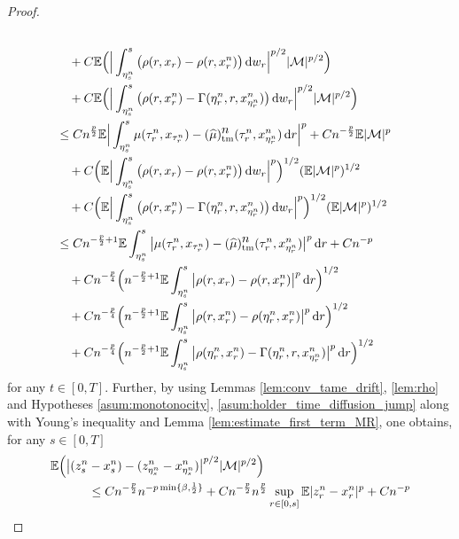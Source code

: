 \documentclass[reqno,  oneside, 12pt]{amsart}
\newcommand{\E}{\mathbb E}
\begin{document}
\begin{proof}
\begin{align}
		\\
		&\quad
		+C\E\Big(\Big|\int_{\eta^n_s}^s\big(\rho(r,x_r)-\rho(r,x_r^{n})\big)\, \mathrm{d}w_r\Big|^{p/2} |\mathcal M|^{p/2}\Big)  \notag
		\\
		&\quad+C\E\Big(\Big|\int_{\eta^n_s}^s\big(\rho(r,x_r^{n})-{\Gamma}(\eta^n_r,r,x_{\eta^n_r}^{n})\big)\, \mathrm{d}w_r\Big|^{p/2}|\mathcal M|^{p/2}\Big) \notag
		\\
		&\leq   Cn^{\frac{p}{2}}\E\Big|\int_{\eta^n_s}^s\mu(\tau_r^n,x_{\tau^n_r})-(\widehat {\mu})_{\mathrm{tm}}^{\displaystyle n}(\tau_r^n,x_{\eta^n_r}^{n})\, \mathrm{d}r\Big|^p+ Cn^{-\frac{p}{2}}\E|\mathcal M|^p \notag
		\\
		&
		\quad+C\Big(\E\Big|\int_{\eta^n_s}^s\big(\rho(r,x_r)-\rho(r,x_r^{n})\big)\, \mathrm{d}w_r\Big|^{p}\Big)^{1/2}(\E|\mathcal M|^{p})^{1/2} 
		\notag
		\\
		&
		\quad+C\Big(\E\Big|\int_{\eta^n_s}^s\big(\rho(r,x_r^{n})-{\Gamma}(\eta^n_r,r,x_{\eta^n_r}^{n})\big)\, \mathrm{d}w_r\Big|^p\Big)^{1/2}(\E|\mathcal M|^p)^{1/2} 
		\notag
		\\
		&\leq Cn^{-\frac{p}{2}+1}\E\int_{\eta^n_s}^s\big|\mu(\tau_r^n,x_{\tau^n_r})-(\widehat {\mu})_{\mathrm{tm}}^{\displaystyle n}(\tau_r^n,x_{\eta^n_r}^{n})\big|^p \, \mathrm{d}r +Cn^{-p} \notag
		\\
		&
		\quad+Cn^{-\frac{p}{4}}\Big(n^{-\frac{p}{2}+1}\E\int_{\eta^n_s}^s\big|\rho(r,x_r)-\rho(r,x_r^{n})\big|^p\, \mathrm{d}r\Big)^{1/2} \notag
		\\
		&
		\quad+Cn^{-\frac{p}{4}}\Big(n^{-\frac{p}{2}+1}\E\int_{\eta^n_s}^s\big|\rho(r,x_r^n)-\rho(\eta^n_r,x_r^{n})\big|^p\, \mathrm{d}r\Big)^{1/2}  \notag
		\\
		&
		\quad	+Cn^{-\frac{p}{4}}\Big(n^{-\frac{p}{2}+1}\E\int_{\eta^n_s}^s\big|\rho(\eta^n_r,x_r^{n})-{\Gamma}(\eta^n_r,r,x_{\eta^n_r}^{n})\big|^p\, \mathrm{d}r\Big)^{1/2} 
	\end{align}
	for any $t\in[0,T]$. Further, by using Lemmas  \ref{lem:conv_tame_drift}, \ref{lem:rho} and  {Hypotheses \ref{asum:monotonocity}, \ref{asum:holder_time_diffusion_jump}} along with Young's inequality and Lemma \ref{lem:estimate_first_term_MR},  one obtains, 	for any $s\in[0,T]$ 
	\begin{align*}
		\E  \Big(\big|(z_s^n&-x_s^n)-(z_{\eta^n_s}^n-x_{\eta^n_s}^n)\big|^{p/2}|\mathcal M|^{p/2}\Big)
		\\
		&\leq Cn^{-\frac{p}{2}}n^{-p\min\{\beta,\frac{1}{2}\}}+ Cn^{-\frac{p}{2}}n^{\frac{p}{2}}\sup_{ r\in[0,s]}\E|z_r^n-x_r^n|^p+ Cn^{-p} \notag
		\\

\end{align*}
\end{proof}
\end{document}
